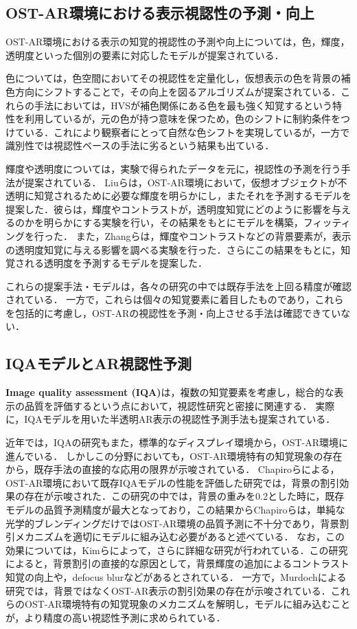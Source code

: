 \documentclass[a4j,10pt,fleqn]{rinkoj}
\begin{document}
\subsection{OST-AR環境における表示視認性の予測・向上}
OST-AR環境における表示の知覚的視認性の予測や向上については，色，輝度，透明度といった個別の要素に対応したモデルが提案されている．

色については，色空間においてその視認性を定量化し，仮想表示の色を背景の補色方向にシフトすることで，その向上を図るアルゴリズムが提案されている\cite{Yoon2017colorHUD,Zhang2022colorcontrast}．これらの手法においては，HVSが補色関係にある色を最も強く知覚するという特性を利用しているが，元の色が持つ意味を保つため，色のシフトに制約条件をつけている．これにより観察者にとって自然な色シフトを実現しているが，一方で識別性では視認性ベースの手法に劣るという結果も出ている\cite{Zhang2022colorcontrast}．

輝度や透明度については，実験で得られたデータを元に，視認性の予測を行う手法が提案されている．
Liuらは，OST-AR環境において，仮想オブジェクトが不透明に知覚されるために必要な輝度を明らかにし，またそれを予測するモデルを提案した\cite{Liu2022howbr}．彼らは，輝度やコントラストが，透明度知覚にどのように影響を与えるのかを明らかにする実験を行い，その結果をもとにモデルを構築，フィッティングを行った．
また，Zhangらは，輝度やコントラストなどの背景要素が，表示の透明度知覚に与える影響を調べる実験を行った\cite{Zhang2021PerceivedTrans}．さらにこの結果をもとに，知覚される透明度を予測するモデルを提案した．

これらの提案手法・モデルは，各々の研究の中では既存手法を上回る精度が確認されている．
一方で，これらは個々の知覚要素に着目したものであり，これらを包括的に考慮し，OST-ARの視認性を予測・向上させる手法は確認できていない．

\subsection{IQAモデルとAR視認性予測}
\textbf{Image quality assessment (IQA)}は，複数の知覚要素を考慮し，総合的な表示の品質を評価するという点において，視認性研究と密接に関連する．
実際に，IQAモデルを用いた半透明AR表示の視認性予測手法も提案されている\cite{Fukiage2014Vbb}．

近年では，IQAの研究もまた，標準的なディスプレイ環境から，OST-AR環境に進んでいる．
しかしこの分野においても，OST-AR環境特有の知覚現象の存在から，既存手法の直接的な応用の限界が示唆されている．
Chapiroらによる，OST-AR環境において既存IQAモデルの性能を評価した研究では，背景の割引効果の存在が示唆された\cite{Chapiro2024ARDAVID}．この研究の中では，背景の重みを0.2とした時に，既存モデルの品質予測精度が最大となっており，この結果からChapiroらは，単純な光学的ブレンディングだけではOST-AR環境の品質予測に不十分であり，背景割引メカニズムを適切にモデルに組み込む必要があると述べている．
なお，この効果については，Kimらによって，さらに詳細な研究が行われている\cite{Kim2025supra}．この研究によると，背景割引の直接的な原因として，背景輝度の追加によるコントラスト知覚の向上や，defocus blurなどがあるとされている．
一方で，Murdochによる研究では，背景ではなくOST-AR表示の割引効果の存在が示唆されている\cite{Murdoch2020brightnessMathch}．これらのOST-AR環境特有の知覚現象のメカニズムを解明し，モデルに組み込むことが，より精度の高い視認性予測に求められている．
\end{document}
